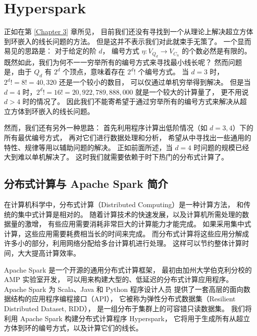 
\chapter{Hyperspark}
\label{Chapter 4}

正如在第 \ref{Chapter 3} 章所见，
目前我们还没有寻找到一个从理论上解决超立方体到环嵌入的线长问题的方法。
但是这并不表示我们对此就束手无策了。
一个显而易见的思路是：
对于给定的阶 $d$，
编号方式 $\eta \colon V_{Q_d} \rightarrow V_{C_n}$ 的个数必然是有限的。
既然如此，我们为何不一一穷举所有的编号方式来寻找最小线长呢？
然而问题是，由于 $Q_d$ 有 $2^d$ 个顶点，意味着存在 $2^d !$ 个编号方式。
当 $d = 3$ 时，$2^d ! = 8 ! = 40,320$ 还是一个较小的数目，
可以仅通过单机穷举得到解决。
但是当 $d = 4$ 时，$2^d ! = 16 ! = 20,922,789,888,000$ 就是一个较大的计算量了，
更不用说 $d > 4$ 时的情况了。
因此我们不能寄希望于通过穷举所有的编号方式来解决从超立方体到环嵌入的线长问题。

然而，我们还有另外一种思路：
首先利用程序计算出低阶情况（如 $d = 3, 4$）下的所有最优编号方式，
再对它们进行数据处理和分析，
希望从中寻找出一些通用的特性、规律等用以辅助问题的解决。
正如前面所述，当 $d = 4$ 时问题的规模已经大到难以单机解决了。
这时我们就需要依赖于时下热门的分布式计算了。

\section{分布式计算与 Apache Spark 简介}
\label{Section 4.1}

在计算机科学中，分布式计算（Distributed Computing）是一种计算方法，
和传统的集中式计算是相对的。
随着计算技术的快速发展，以及计算机所需处理的数据量的激增，
有些应用需要消耗非常巨大的计算能力才能完成。
如果采用集中式计算，这些应用需要耗费相当长的时间来完成。
而分布式计算将这些应用分解成许多小的部分，利用网络分配给多台计算机进行处理。
这样可以节约整体计算时间，大大提高计算效率。

Apache Spark 是一个开源的通用分布式计算框架，
最初由加州大学伯克利分校的 AMP 实验室开发，
可以用来构建大型的、低延迟的分布式计算应用程序。
Apache Spark 为 Scala、Java 和 Python 程序设计人员
提供了一套高层的面向数据结构的应用程序编程接口（API），
它被称为弹性分布式数据集（Resilient Distributed Dataset, RDD）\cite{Zaharia.2012}，
是一组分布于集群上的可容错只读数据集。
我们将利用 Apache Spark 构建分布式计算程序 Hyperspark，
它将用于生成所有从超立方体到环的编号方式，以及计算它们的线长。

